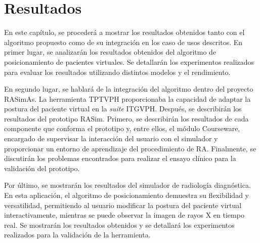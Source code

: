 \chapter*{Resultados} 
\label{cap:results}

En este capítulo, se procederá a mostrar los resultados obtenidos tanto con el algoritmo propuesto como de su integración en los caso de usos descritos. 
%
En primer lugar, se analizarán los resultados obtenidos del algoritmo de posicionamiento de pacientes virtuales. Se detallarán los experimentos realizados para evaluar los resultados utilizando distintos modelos y el rendimiento.

En segundo lugar, se hablará de la integración del algoritmo dentro del proyecto \ac{RASimAs}. La herramienta \ac{TPTVPH} proporcionaba la capacidad de adaptar la postura del paciente virtual en la \emph{suite} \ac{ITGVPH}. %
Después, se describirán los resultados del prototipo \ac{RASim}. Primero, se describirán los resultados de cada componente que conforma el prototipo y, entre ellos, el módulo \acs{Courseware}, encargado de supervisar la interacción del usuario con el simulador y proporcionar un entorno de aprendizaje del procedimiento de \ac{RA}. Finalmente, se discutirán los problemas encontrados para realizar el ensayo clínico para la validación del prototipo. %

Por último, se mostrarán los resultados del simulador de radiología diagnóstica. En esta aplicación, el algoritmo de posicionamiento demuestra su flexibilidad y versatilidad, permitiendo al usuario modificar la postura del paciente virtual interactivamente, mientras se puede observar la imagen de rayos X en tiempo real. Se mostrarán los resultados obtenidos y se detallará los experimentos realizados para la validación de la herramienta. %


